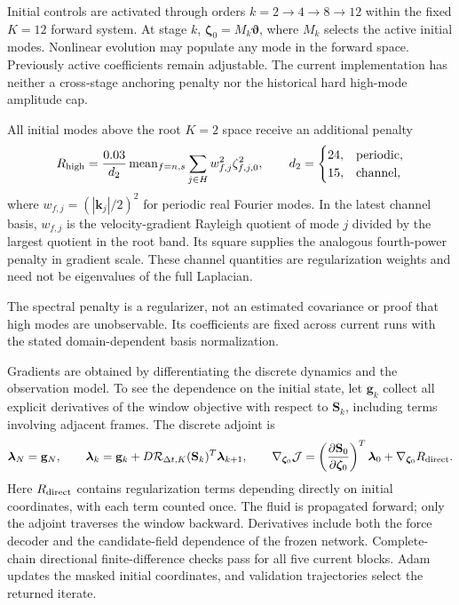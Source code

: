 \documentclass[11pt]{article}
\numberwithin{equation}{section}
\begin{document}
Initial controls are activated through orders $k=2\to4\to8\to12$ within the fixed $K=12$ forward system. At stage $k$, $\bm\zeta_0=M_k\bm\vartheta$, where $M_k$ selects the active initial modes. Nonlinear evolution may populate any mode in the forward space. Previously active coefficients remain adjustable. The current implementation has neither a cross-stage anchoring penalty nor the historical hard high-mode amplitude cap.

All initial modes above the root $K=2$ space receive an additional penalty
\begin{equation}
 R_{\rm high}=\frac{0.03}{d_2}\operatorname{mean}_{f=n,s}
       \sum_{j\in H}w_{f,j}^2\zeta_{f,j,0}^2,
 \qquad d_2=\begin{cases}24,&\text{periodic},\\15,&\text{channel},\end{cases}
 \label{eq:highregularization}
\end{equation}
where $w_{f,j}=(|\mathbf k_j|/2)^2$ for periodic real Fourier modes. In the latest channel basis, $w_{f,j}$ is the velocity-gradient Rayleigh quotient of mode $j$ divided by the largest quotient in the root band. Its square supplies the analogous fourth-power penalty in gradient scale. These channel quantities are regularization weights and need not be eigenvalues of the full Laplacian.

The spectral penalty is a regularizer, not an estimated covariance or proof that high modes are unobservable. Its coefficients are fixed across current runs with the stated domain-dependent basis normalization.

Gradients are obtained by differentiating the discrete dynamics and the observation model. To see the dependence on the initial state, let $\mathbf g_k$ collect all explicit derivatives of the window objective with respect to $\mathbf S_k$, including terms involving adjacent frames. The discrete adjoint is
\begin{equation}
 \bm\lambda_N=\mathbf g_N,\qquad
 \bm\lambda_k=\mathbf g_k+
    D\mathcal R_{\Delta t,K}(\mathbf S_k)^T\bm\lambda_{k+1},
 \qquad
 \nabla_{\bm\zeta_0}\mathcal J
 =\left(\frac{\partial\mathbf S_0}{\partial\bm\zeta_0}\right)^T\bm\lambda_0
   +\nabla_{\bm\zeta_0}R_{\rm direct}.
 \label{eq:discreteadjoint}
\end{equation}
Here $R_{\rm direct}$ contains regularization terms depending directly on initial coordinates, with each term counted once. The fluid is propagated forward; only the adjoint traverses the window backward. Derivatives include both the force decoder and the candidate-field dependence of the frozen network. Complete-chain directional finite-difference checks pass for all five current blocks. Adam updates the masked initial coordinates, and validation trajectories select the returned iterate.
\end{document}
